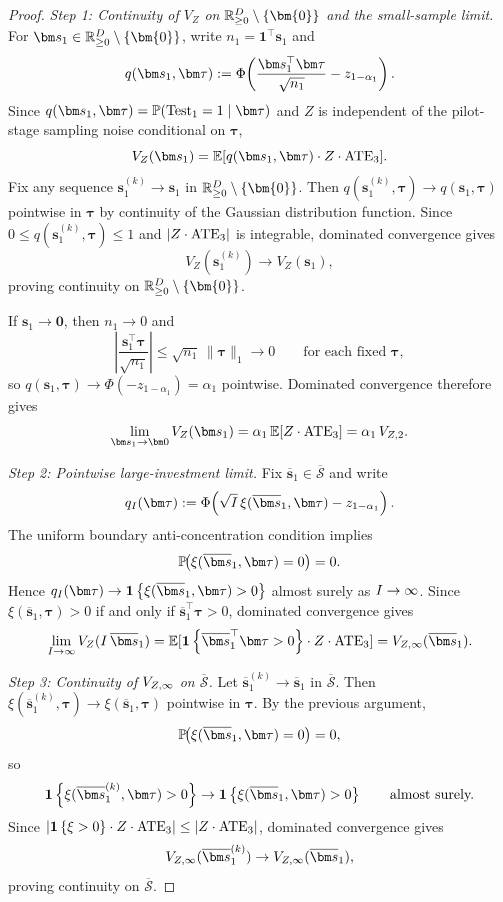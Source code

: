 \begin{proof}
  \emph{Step 1: Continuity of $V_Z$ on $\R_{\geq 0}^{D} \setminus \{\bm{0}\}$ and the small-sample limit.}
  For $\bm s_1\in\R_{\geq 0}^{D} \setminus \{\bm{0}\}$, write $n_1=\bm1^\top\bm s_1$ and
  \[
    q(\bm s_1,\bm\tau)
    \defeq
    \Phi\!\left(
      \frac{\bm s_1^\top\bm\tau}{\sqrt{n_1}}
      -
      z_{1-\alpha_1}
    \right).
  \]
  Since $q(\bm s_1,\bm\tau)=\P(\Test_1=1\mid\bm\tau)$ and $Z$ is independent of the pilot-stage sampling noise conditional on $\bm\tau$,
  \[
    V_Z(\bm s_1)
    =
    \E[q(\bm s_1,\bm\tau)\cdot Z\cdot \ATE_3].
  \]
  Fix any sequence $\bm s_1^{(k)}\to \bm s_1$ in $\R_{\geq 0}^{D} \setminus \{\bm{0}\}$.
  Then $q(\bm s_1^{(k)},\bm\tau)\to q(\bm s_1,\bm\tau)$ pointwise in $\bm\tau$ by continuity of the Gaussian distribution function.
  Since $0\le q(\bm s_1^{(k)},\bm\tau)\le 1$ and $|Z \cdot \mathrm{ATE}_3|$ is integrable, dominated convergence gives
  \[
    V_Z(\bm s_1^{(k)})\to V_Z(\bm s_1),
  \]
  proving continuity on $\R_{\geq 0}^{D} \setminus \{\bm{0}\}$.

  If $\bm s_1\to\bm0$, then $n_1\to0$ and
  \[
    \left|\frac{\bm s_1^\top\bm\tau}{\sqrt{n_1}}\right|
    \le
    \sqrt{n_1}\,\|\bm\tau\|_1
    \to 0
    \qquad\text{for each fixed }\bm\tau,
  \]
  so $q(\bm s_1,\bm\tau)\to\Phi(-z_{1-\alpha_1})=\alpha_1$ pointwise.
  Dominated convergence therefore gives
  \[
    \lim_{\bm s_1\to\bm0}V_Z(\bm s_1)
    =
    \alpha_1\,\E[Z\cdot \ATE_3]
    =
    \alpha_1\,V_{Z,\followup}.
  \]

  \emph{Step 2: Pointwise large-investment limit.}
  Fix $\overline{\bm s}_1\in\overline{\mathcal{S}}$ and write
  \[
    q_{\invst}(\bm\tau)
    \defeq
    \Phi\!\left(
      \sqrt{\invst}\,\xi(\overline{\bm s}_1,\bm\tau)
      -
      z_{1-\alpha_1}
    \right).
  \]
  The uniform boundary anti-concentration condition implies
  \[
    \P\!\big(
      \xi(\overline{\bm s}_1,\bm\tau)=0
    \big)=0.
  \]
  Hence $q_{\invst}(\bm\tau)\to \indic{\xi(\overline{\bm s}_1,\bm\tau)>0}$ almost surely as $I\to\infty$.
  Since $\xi(\overline{\bm s}_1,\bm\tau)>0$ if and only if $\overline{\bm s}_1^\top\bm\tau>0$, dominated convergence gives
  \[
    \lim_{\invst\to\infty}V_Z(\invst\,\overline{\bm s}_1)
    =
    \E[\indic{\overline{\bm s}_1^\top\bm\tau>0}\cdot Z\cdot \ATE_3]
    =
    V_{Z,\noisefree}(\overline{\bm s}_1).
  \]

  \emph{Step 3: Continuity of $V_{Z,\infty}$ on $\overline{\mathcal{S}}$.}
  Let $\overline{\bm s}_1^{(k)}\to\overline{\bm s}_1$ in $\overline{\mathcal{S}}$.
  Then $\xi(\overline{\bm s}_1^{(k)},\bm\tau)\to\xi(\overline{\bm s}_1,\bm\tau)$ pointwise in $\bm\tau$.
  By the previous argument,
  \[
    \P\!\big(\xi(\overline{\bm s}_1,\bm\tau)=0\big)=0,
  \]
  so
  \[
    \indic{\xi(\overline{\bm s}_1^{(k)},\bm\tau)>0}
    \to
    \indic{\xi(\overline{\bm s}_1,\bm\tau)>0}
    \qquad\text{almost surely.}
  \]
  Since $|\mathbf{1}\left\{\xi>0\right\}\cdot Z\cdot \mathrm{ATE}_3|\le |Z \cdot \mathrm{ATE}_3|$, dominated convergence gives
  \[
    V_{Z,\noisefree}(\overline{\bm s}_1^{(k)})
    \to
    V_{Z,\noisefree}(\overline{\bm s}_1),
  \]
  proving continuity on $\overline{\mathcal{S}}$.
\end{proof}

